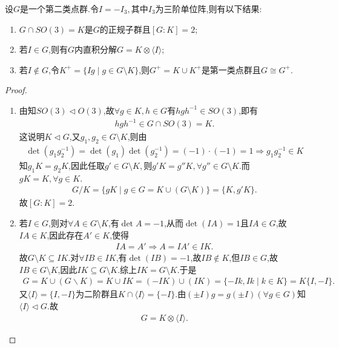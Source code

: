 \documentclass[../../main.tex]{subfiles}%
\begin{document}
\begin{theorem}\label{theorem:抽象代数--定理4.9.1}
设$G$是一个第二类点群.令$I=-I_3,$其中$I_3$为三阶单位阵,则有以下结果:
\begin{enumerate}[(1)]
\item $G \cap SO(3)=K$是$G$的正规子群且$[G:K]=2$;

\item 若$I \in G$,则有$G$内直积分解$G=K \otimes \langle I \rangle$;

\item 若$I \notin G$,令$K^+=\{Ig\mid g \in G\setminus K\}$,则$G^+=K \cup K^+$是第一类点群且$G \cong G^+$.
\end{enumerate}
\end{theorem}
\begin{proof}
\begin{enumerate}[(1)]
\item 由知$SO(3) \lhd O(3)$,故$\forall g \in K, h \in G$有$hgh^{-1} \in SO(3)$,即有
\begin{align*}
hgh^{-1} \in G \cap SO(3)=K.
\end{align*}
这说明$K \lhd G$,又$g_1, g_2 \in G \setminus K$,则由
\begin{align*}
\det(g_1g_2^{-1})=\det(g_1)\det(g_2^{-1})=(-1)\cdot(-1)=1\Longrightarrow g_1g_2^{-1}\in K
\end{align*}
知$g_1K=g_2K$,因此任取$g'\in G\setminus K,$则$g'K=g''K,\forall g''\in G\setminus K.$而$gK=K,\forall g\in K$.
\begin{align*}
G/K=\{gK\mid g\in G=K\cup (G\setminus K)\}=\{K,g'K\}.
\end{align*}
故$[G:K]=2$.

\item 若$I \in G$,则对$\forall A\in G\setminus K$,有$\det A=-1$,从而$\det \left( IA \right) =1$且$IA\in G$,故$IA\in K$,因此存在$A'\in K$,使得
\begin{align*}
IA=A'\Longrightarrow A=IA'\in IK.
\end{align*}
故$G\setminus K\subseteq IK$.对$\forall IB\in IK$,有$\det \left( IB \right) =-1$,故$IB\notin K$,但$IB\in G$,故$IB\in G\setminus K$,因此$IK\subseteq G\setminus K$.综上$IK=G\setminus K$.于是
\begin{align*}
G=K\cup \left( G\backslash K \right) =K\cup IK=(-IK)\cup (IK)=\{-Ik,Ik\mid k\in K\}=K\{I,-I\}.
\end{align*}
又$\langle I \rangle=\{I,-I\}$为二阶群且$K\cap \langle I \rangle=\{-I\}$.由$(\pm I)g=g(\pm I)(\forall g \in G)$知$\langle I \rangle\lhd G$.故
\begin{align*}
G=K \otimes \langle I \rangle.
\end{align*}


\end{enumerate}
\end{proof}
\end{document}
